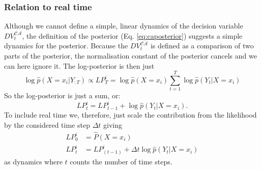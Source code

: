 \documentclass[10pt,a4paper]{article}
\begin{document}
\subsubsection{Relation to real time}
Although we cannot define a simple, linear dynamics of the decision variable $DV_t^{\mathcal{CA}}$, the definition of the posterior (Eq. \ref{eq:caposterior}) suggests a simple dynamics for the posterior. Because the $DV_t^{\mathcal{CA}}$ is defined as a comparison of two parts of the posterior, the normalisation constant of the posterior cancels and we can here ignore it. The log-posterior is then just
\begin{equation}
\log\hat{p}(X=x_i | Y_{:T}) \propto LP_T^i= \log\hat{p}(X=x_i)\sum_{t=1}^T \log\hat{p}(Y_t | X=x_i)
\end{equation}
So the log-posterior is just a sum, or:
\begin{equation}
LP_t^i = LP_{t-1}^i + \log\hat{p}(Y_t | X=x_i).
\end{equation}
To include real time we, therefore, just scale the contribution from the likelihood by the considered time step $\Delta t$ giving
\begin{align}
LP_0^i &= \hat{P}(X = x_i)\\
LP_{t}^i &= LP_{(t-1)}^i + \Delta t\log\hat{p}(Y_t | X=x_i)
\end{align}
as dynamics where $t$ counts the number of time steps.
\end{document}
